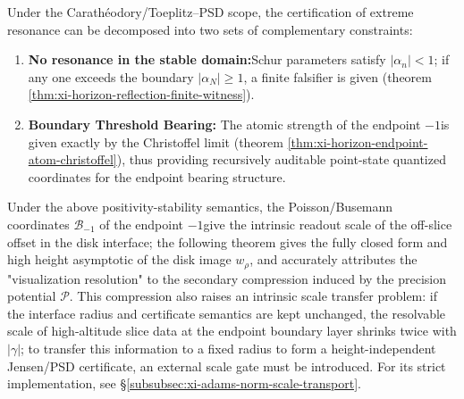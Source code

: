 \begin{corollary}\label{cor:xi-horizon-extreme-resonance-two-stage}
Under the Carath\'eodory/Toeplitz--PSD scope, the certification of extreme resonance can be decomposed into two sets of complementary constraints:
\begin{enumerate}
  \item \textbf{No resonance in the stable domain:}Schur parameters satisfy \(|\alpha_n|<1\); if any one exceeds the boundary \(|\alpha_N|\ge 1\), a finite falsifier is given (theorem \ref{thm:xi-horizon-reflection-finite-witness}).
  \item \textbf{Boundary Threshold Bearing:} The atomic strength of the endpoint \(-1\) ​​is given exactly by the Christoffel limit (theorem \ref{thm:xi-horizon-endpoint-atom-christoffel}), thus providing recursively auditable point-state quantized coordinates for the endpoint bearing structure.
\end{enumerate}
\end{corollary}

Under the above positivity-stability semantics, the Poisson/Busemann coordinates \(\mathcal{B}_{-1}\) of the endpoint \(-1\) ​​give the intrinsic readout scale of the off-slice offset in the disk interface; the following theorem gives the fully closed form and high height asymptotic of the disk image \(w_\rho\), and accurately attributes the "visualization resolution" to the secondary compression induced by the precision potential \(\mathcal{P}\).
This compression also raises an intrinsic scale transfer problem: if the interface radius and certificate semantics are kept unchanged, the resolvable scale of high-altitude slice data at the endpoint boundary layer shrinks twice with \(|\gamma|\); to transfer this information to a fixed radius to form a height-independent Jensen/PSD certificate, an external scale gate must be introduced. For its strict implementation, see \S\ref{subsubsec:xi-adams-norm-scale-transport}.

